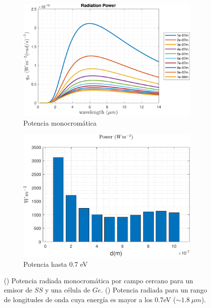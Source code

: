 \begin{figure}[H]
	\centering
	\begin{subfigure}[b]{0.49\textwidth}
	\centering
		\includegraphics[width=1.00\textwidth]{figuras/Resultados/radiacion/SsGe.pdf}
	\caption{Potencia monocromática}
	\label{fig:SsGe}
\end{subfigure}
\begin{subfigure}[b]{0.49\textwidth}
	\centering
		\includegraphics[width=1.00\textwidth]{figuras/Resultados/radiacion/p_Eg_SsGe.pdf}
	\caption{Potencia hasta 0.7 eV}
	\label{fig:p_Eg_SsGe}
\end{subfigure}
\caption{() Potencia radiada monocromática por campo cercano para un emisor de $SS$ y una célula de $Ge$. () Potencia radiada para un rango de longitudes de onda cuya energía es mayor a los 0.7eV ($\sim 1.8 \ \mu m$).}
	\label{fig:rad_SsGe}
\end{figure}
